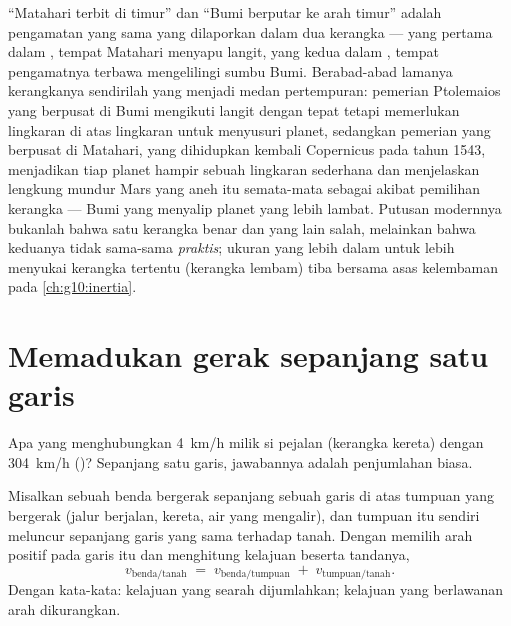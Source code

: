 \begin{remark}\label{rem:g10:relative-motion:history}
``Matahari terbit di timur'' dan ``Bumi berputar ke arah timur'' adalah
pengamatan yang sama yang dilaporkan dalam dua kerangka --- yang pertama
dalam , tempat Matahari menyapu langit, yang kedua dalam
, tempat pengamatnya terbawa mengelilingi sumbu Bumi.
Berabad-abad lamanya kerangkanya sendirilah yang menjadi medan
pertempuran: pemerian Ptolemaios yang berpusat di Bumi mengikuti langit
dengan tepat tetapi memerlukan lingkaran di atas lingkaran untuk
menyusuri planet, sedangkan pemerian yang berpusat di Matahari, yang
dihidupkan kembali Copernicus pada tahun 1543, menjadikan tiap planet
hampir sebuah lingkaran sederhana dan menjelaskan lengkung mundur Mars
yang aneh itu semata-mata sebagai akibat pemilihan kerangka --- Bumi yang
menyalip planet yang lebih lambat. Putusan modernnya bukanlah bahwa satu
kerangka benar dan yang lain salah, melainkan bahwa keduanya tidak
sama-sama \emph{praktis}; ukuran yang lebih dalam untuk lebih menyukai
kerangka tertentu (kerangka lembam) tiba bersama asas kelembaman pada
\cref{ch:g10:inertia}.
\end{remark}

\section{Memadukan gerak sepanjang satu garis}

Apa yang menghubungkan \qty{4}{km/h} milik si pejalan (kerangka kereta)
dengan \qty{304}{km/h} ()? Sepanjang satu garis,
jawabannya adalah penjumlahan biasa.

\begin{proposition}\label{prop:g10:relative-motion:compose}
Misalkan sebuah benda bergerak sepanjang sebuah garis di atas tumpuan
yang bergerak (jalur berjalan, kereta, air yang mengalir), dan tumpuan
itu sendiri meluncur sepanjang garis yang sama terhadap tanah. Dengan
memilih arah positif pada garis itu dan menghitung kelajuan beserta
tandanya,
\[
v_{\text{benda/tanah}} \;=\; v_{\text{benda/tumpuan}} \;+\;
v_{\text{tumpuan/tanah}} .
\]
Dengan kata-kata: kelajuan yang searah dijumlahkan; kelajuan yang
berlawanan arah dikurangkan.
\end{proposition}

